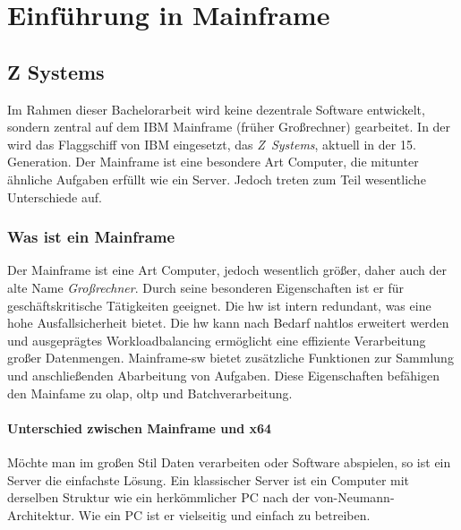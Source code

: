 \chapter{Einführung in Mainframe}


\section{Z Systems}
Im Rahmen dieser Bachelorarbeit wird keine dezentrale Software entwickelt, sondern zentral auf dem IBM Mainframe (früher Großrechner) gearbeitet.  In der \FirmenName wird das Flaggschiff von IBM eingesetzt, das \emph{Z~Systems}, aktuell in der 15. Generation. Der Mainframe ist eine besondere Art Computer, die mitunter ähnliche Aufgaben erfüllt wie ein Server. Jedoch treten zum Teil wesentliche Unterschiede auf.

\subsection{Was ist ein Mainframe}

Der Mainframe ist eine Art Computer, jedoch wesentlich größer, daher auch der alte Name \emph{Großrechner}. Durch seine besonderen Eigenschaften ist er für geschäftskritische Tätigkeiten geeignet. Die \ac{hw} ist intern redundant, was eine hohe Ausfallsicherheit bietet. Die \ac{hw} kann nach Bedarf nahtlos erweitert werden und ausgeprägtes Workloadbalancing ermöglicht eine effiziente Verarbeitung großer Datenmengen. Mainframe-\ac{sw} bietet zusätzliche Funktionen zur Sammlung und anschließenden Abarbeitung von Aufgaben. Diese Eigenschaften befähigen den Mainfame zu \ac{olap}, \ac{oltp} und Batchverarbeitung.


\subsubsection[Z Systems vs. x64]{Unterschied zwischen Mainframe und x64}

Möchte man im großen Stil Daten verarbeiten oder Software abspielen, so ist ein Server die einfachste Lösung. Ein klassischer Server ist ein Computer mit derselben Struktur wie ein herkömmlicher PC nach der \mbox{von-Neumann-Architektur}. Wie ein PC ist er vielseitig und einfach zu betreiben.

